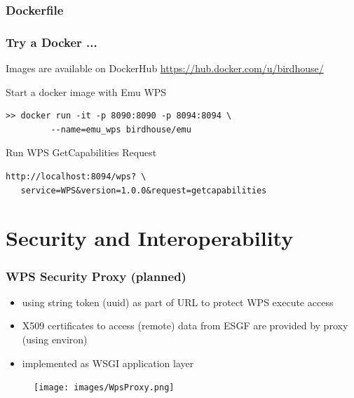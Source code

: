\documentclass{beamer}
\begin{document}

  \begin{frame}
    \frametitle{Dockerfile}
    
\end{frame}


  \begin{frame}
    \frametitle{Try a Docker ...}
    \begin{block}{Images are available on DockerHub}
      \url{https://hub.docker.com/u/birdhouse/}
    \end{block}
    \begin{block}{Start a docker image with Emu WPS}
      \begin{verbatim}
>> docker run -it -p 8090:8090 -p 8094:8094 \
         --name=emu_wps birdhouse/emu  
      \end{verbatim}
    \end{block}
    \begin{block}{Run WPS GetCapabilities Request}
      \begin{verbatim}
http://localhost:8094/wps? \
   service=WPS&version=1.0.0&request=getcapabilities
      \end{verbatim}
    \end{block}
\end{frame}


  \section{Security and Interoperability}


  \begin{frame}[plain]
    \frametitle{WPS Security Proxy (planned)}
    \begin{itemize}
      \item using string token (uuid) as part of URL to protect WPS execute access
      \item X509 certificates to access (remote) data from ESGF are provided by proxy (using environ)
      \item implemented as WSGI application layer
    \end{itemize}
    \begin{figure}
      \texttt{[image: images/WpsProxy.png]}
    \end{figure}
  \end{frame}
\end{document}

